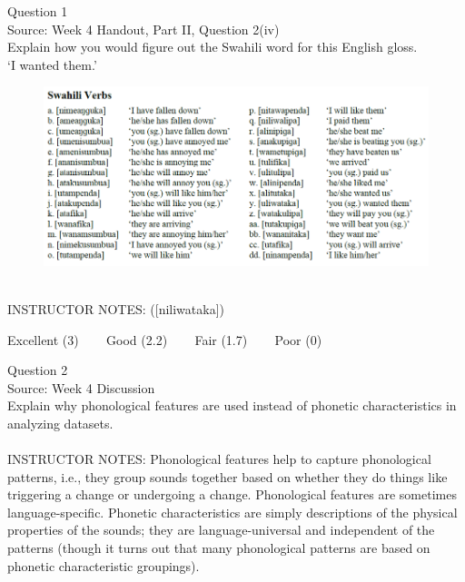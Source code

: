 \documentclass[12pt]{article}
\begin{document}
\begin{center}
\textbf{{\color{blue}{\HUGE START OF EXAM\\}}}

\textbf{{\color{blue}{\HUGE Student ID: 23000\\}}}

\textbf{{\color{blue}{\HUGE 9:10\\}}}

\end{center}
\newpage

{\large Question 1}\\

Source: Week 4 Handout, Part II, Question 2(iv)\\

Explain how you would figure out the Swahili word for this English gloss.\\

‘I wanted them.’

\begin{figure}[H]
\includegraphics{../images/swahiliverbs.png}
\end{figure}

~\\
INSTRUCTOR NOTES: ([niliwataka])


\vfill
Excellent (3) ~~~ Good (2.2) ~~~ Fair (1.7) ~~~ Poor (0)
\newpage

{\large Question 2}\\

Source: Week 4 Discussion\\

Explain why phonological features are used instead of phonetic characteristics in analyzing datasets.\\


~\\
INSTRUCTOR NOTES: Phonological features help to capture phonological patterns, i.e., they group sounds together based on whether they do things like triggering a change or undergoing a change. Phonological features are sometimes language-specific. Phonetic characteristics are simply descriptions of the physical properties of the sounds; they are language-universal and independent of the patterns (though it turns out that many phonological patterns are based on phonetic characteristic groupings).
\end{document}
